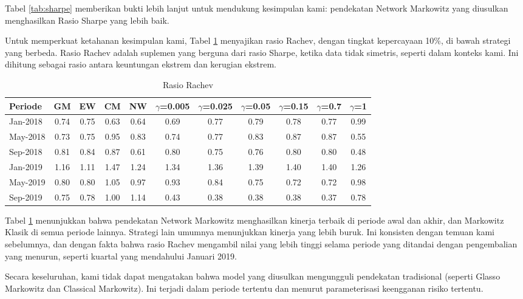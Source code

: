 \documentclass[12pt,a4paper]{article}
\begin{document}
Tabel \ref{tab:sharpe} memberikan bukti lebih lanjut untuk mendukung kesimpulan kami: pendekatan Network Markowitz yang diusulkan menghasilkan Rasio Sharpe yang lebih baik.

Untuk memperkuat ketahanan kesimpulan kami, Tabel \ref{tab:rachev} menyajikan rasio Rachev, dengan tingkat kepercayaan 10\%, di bawah strategi yang berbeda. Rasio Rachev adalah suplemen yang berguna dari rasio Sharpe, ketika data tidak simetris, seperti dalam konteks kami. Ini dihitung sebagai rasio antara keuntungan ekstrem dan kerugian ekstrem.

\begin{table}[H]
\centering
\caption{Rasio Rachev}
\label{tab:rachev}
\begin{tabular}{lcccccccccc}
\toprule
Periode & GM & EW & CM & NW & $\gamma$=0.005 & $\gamma$=0.025 & $\gamma$=0.05 & $\gamma$=0.15 & $\gamma$=0.7 & $\gamma$=1 \\
\midrule
Jan-2018 & 0.74 & 0.75 & 0.63 & 0.64 & 0.69 & 0.77 & 0.79 & 0.78 & 0.77 & 0.99 \\
May-2018 & 0.73 & 0.75 & 0.95 & 0.83 & 0.74 & 0.77 & 0.83 & 0.87 & 0.87 & 0.55 \\
Sep-2018 & 0.81 & 0.84 & 0.87 & 0.61 & 0.80 & 0.75 & 0.76 & 0.80 & 0.80 & 0.48 \\
Jan-2019 & 1.16 & 1.11 & 1.47 & 1.24 & 1.34 & 1.36 & 1.39 & 1.40 & 1.40 & 1.26 \\
May-2019 & 0.80 & 0.80 & 1.05 & 0.97 & 0.93 & 0.84 & 0.75 & 0.72 & 0.72 & 0.98 \\
Sep-2019 & 0.75 & 0.78 & 1.00 & 1.14 & 0.43 & 0.38 & 0.38 & 0.38 & 0.37 & 0.78 \\
\bottomrule
\end{tabular}
\end{table}

Tabel \ref{tab:rachev} menunjukkan bahwa pendekatan Network Markowitz menghasilkan kinerja terbaik di periode awal dan akhir, dan Markowitz Klasik di semua periode lainnya. Strategi lain umumnya menunjukkan kinerja yang lebih buruk. Ini konsisten dengan temuan kami sebelumnya, dan dengan fakta bahwa rasio Rachev mengambil nilai yang lebih tinggi selama periode yang ditandai dengan pengembalian yang menurun, seperti kuartal yang mendahului Januari 2019.

Secara keseluruhan, kami tidak dapat mengatakan bahwa model yang diusulkan mengungguli pendekatan tradisional (seperti Glasso Markowitz dan Classical Markowitz). Ini terjadi dalam periode tertentu dan menurut parameterisasi keengganan risiko tertentu.
\end{document}
